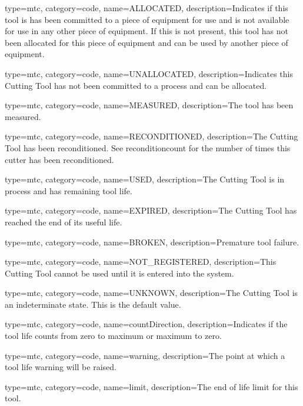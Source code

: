 {
  type=mtc,
  category=code,
  name={ALLOCATED},
  description={Indicates if this tool is has been committed to a piece of equipment for use and is not available for use in any other piece of equipment. If this is not present, this tool has not been allocated for this piece of equipment and can be used by another piece of equipment.}
}

{
  type=mtc,
  category=code,
  name={UNALLOCATED},
  description={Indicates this Cutting Tool has not been committed to a process and can be allocated.
}
}

{
  type=mtc,
  category=code,
  name={MEASURED},
  description={The tool has been measured.}
}

{
  type=mtc,
  category=code,
  name={RECONDITIONED},
  description={The Cutting Tool has been reconditioned. See \gls{reconditioncount} for the number of times this cutter has been reconditioned.}
}

{
  type=mtc,
  category=code,
  name={USED},
  description={The Cutting Tool is in process and has remaining tool life.}
}

{
  type=mtc,
  category=code,
  name={EXPIRED},
  description={The Cutting Tool has reached the end of its useful life.}
}

{
  type=mtc,
  category=code,
  name={BROKEN},
  description={Premature tool failure.}
}

{
  type=mtc,
  category=code,
  name={NOT\_REGISTERED},
  description={This Cutting Tool cannot be used until it is entered into the system.}
}

{
  type=mtc,
  category=code,
  name={UNKNOWN},
  description={The Cutting Tool is an indeterminate state. This is the default value.}
}

{
  type=mtc,
  category=code,
  name={countDirection},
  description={Indicates if the tool life counts from zero to maximum or maximum to zero.}
}

{
  type=mtc,
  category=code,
  name={warning},
  description={The point at which a tool life warning will be raised.}
}

{
  type=mtc,
  category=code,
  name={limit},
  description={The end of life limit for this tool.}
}

